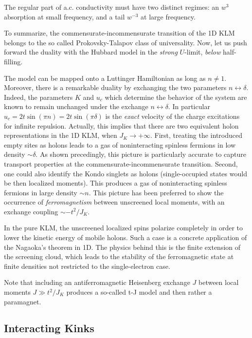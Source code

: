 The regular part of a.c. conductivity
must have two distinct regimes: an $w^3$ absorption at 
small frequency, and a tail $w^{-3}$ at large frequency\cite{Giam1,Giam3}.

To summarize, the commensurate-incommensurate transition
of the 1D KLM belongs to the
so called Prokovsky-Talapov class of universality\cite{Schulz2,pro}.
Now, let us push forward the duality with the Hubbard model in the
\emph{strong} $U$-limit, \emph{below} half-filling. 

The model
can be mapped onto a Luttinger Hamiltonian as long as $n\neq 1$.
Moreover, there is a remarkable duality by exchanging the
two parameters $n\leftrightarrow\delta$. Indeed,
the parameters $K$ and $u_c$ which determine the behavior
of the system are known to remain unchanged under the exchange 
$n\leftrightarrow \delta$\cite{Schulz1}. In particular 
$u_c=2t\sin(\pi n)=2t\sin(\pi\delta)$ is the {\it exact} velocity of the 
charge excitations for infinite repulsion\cite{Lieb-Wu}.
Actually, this implies 
that there are two equivalent holon representations in the
1D KLM, when $J_K\rightarrow +\infty$.
First, treating the introduced empty sites
as holons leads to a gas
of noninteracting spinless fermions in low density 
$\sim\delta$. As shown precedingly, this picture is particularly
accurate to capture transport properties at the commensurate-incommensurate
transition. Second, one could also identify the Kondo singlets as 
holons (single-occupied states would be then localized moments). 
This produces a gas
of noninteracting spinless fermions in large density $\sim n$\cite{Lacroix}. 
This picture has been preferred to show
the occurrence of {\it ferromagnetism}
between unscreened local moments, with an exchange coupling $\sim
-t^2/J_K$\cite{Sigrist,Troyer}. 

In the pure KLM, 
the unscreened localized spins polarize 
completely in order to
lower the kinetic energy of mobile holons. Such a case is a concrete
application of the Nagaoka's theorem in 1D. 
The physics behind this is the
finite extension of the screening cloud, which leads to the stability of the
ferromagnetic state at finite densities not restricted to the 
single-electron case. 

Note that including an antiferromagnetic Heisenberg 
exchange $J$ between local moments $J\gg t^2/J_K$
produces a so-called t-J model and
then rather a paramagnet\cite{Affleck}.

\subsection{Interacting Kinks}

